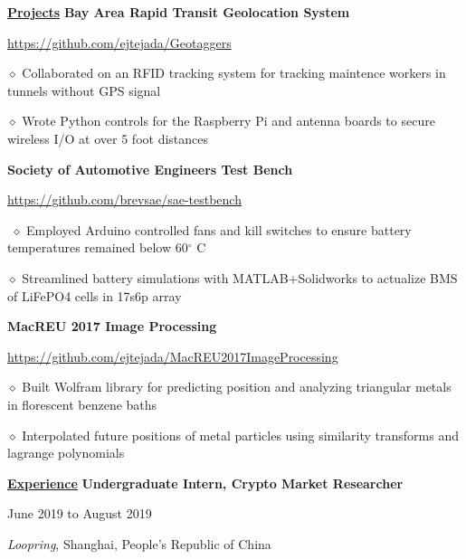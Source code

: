 \documentclass [11pt]{article}
\begin{document}
\begin{flushleft}
\underline{\textbf{Projects}}
\linebreak
\textbf{Bay Area Rapid Transit Geolocation System}\begin{minipage}{0.61 \linewidth}\begin{flushright}\href{https://github.com/ejtejada/Geotaggers}{https://github.com/ejtejada/Geotaggers}\end{flushright}\end{minipage}

‭‭\quad\quad\quad$\diamond$ Collaborated on an RFID tracking system for tracking maintence workers in tunnels without GPS signal

‭‭\quad\quad\quad$\diamond$ Wrote Python controls for the Raspberry Pi and antenna boards to secure wireless I/O at over 5 foot distances

\textbf{Society of Automotive Engineers Test Bench}\begin{minipage}{0.61 \linewidth}\begin{flushright}\href{https://github.com/brevsae/sae-testbench}{https://github.com/brevsae/sae-testbench}\end{flushright}\end{minipage}

‭‭%
\quad\quad\quad$\diamond$ Employed Arduino controlled fans and kill switches to ensure battery temperatures remained below 60$^{\circ}$ C

‭‭\quad\quad\quad$\diamond$ Streamlined battery simulations with MATLAB+Solidworks to actualize BMS of LiFePO4 cells in 17s6p array 

\textbf{MacREU 2017 Image Processing}\begin{minipage}{0.71 \linewidth}\begin{flushright}\href{https://github.com/ejtejada/MacREU2017ImageProcessing}{https://github.com/ejtejada/MacREU2017ImageProcessing}\end{flushright}\end{minipage}

‭‭\quad\quad\quad$\diamond$ ‭Built Wolfram library for predicting position and analyzing triangular metals in florescent benzene baths

‭‭\quad\quad\quad$\diamond$ Interpolated future positions of metal particles using similarity transforms and lagrange polynomials

\vspace{7}
\underline{\textbf{Experience}}
\linebreak
\textbf{Undergraduate Intern, Crypto Market Researcher}\begin{minipage}{0.55 \linewidth}\begin{flushright}June 2019 to August 2019\end{flushright}\end{minipage}
\emph{Loopring}, Shanghai, People's Republic of China


\end{flushleft}
\end{document}
